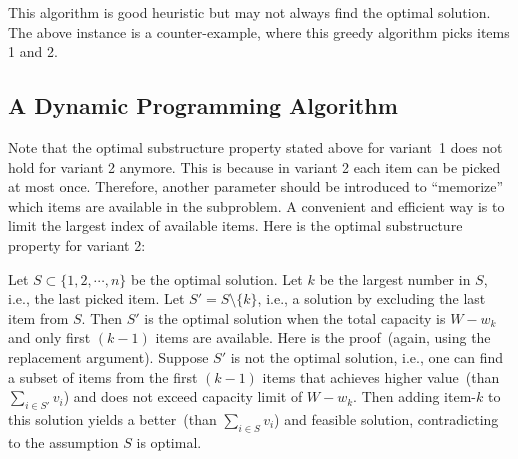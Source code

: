 \begin{algorithmblock}[0.8\textwidth]
	\xxx
	\xxx
	\xxx
	\xxx
	\xxx
	\xxx
	\xxx
	\xxx
	\xxx
\end{algorithmblock}


This algorithm is good heuristic but may not always find the optimal solution.
The above instance is a counter-example, where this greedy algorithm
picks items 1 and 2.


\subsection*{A Dynamic Programming Algorithm}


Note that the optimal substructure property stated above for variant~1 does not hold for variant 2 anymore.
This is because in variant 2 each item can be picked at most once. Therefore, another parameter should
be introduced to ``memorize'' which items are available in the subproblem. A convenient and efficient way is to
limit the largest index of available items. Here is the optimal substructure property for variant 2:

Let $S\subset\{1,2,\cdots, n\}$ be the optimal solution. %
Let $k$ be the largest number in $S$, i.e., the last picked item.
Let $S' = S\setminus \{k\}$, i.e., a solution by excluding the last item from $S$.
Then $S'$ is the optimal solution when the total capacity is $W - w_k$ and only first $(k-1)$ items are available.
Here is the proof~(again, using the replacement argument). 
Suppose $S'$ is not the optimal solution,
i.e., one can find a subset of items from the first $(k-1)$ items that achieves higher value~(than $\sum_{i\in S'} v_i$) 
and does not exceed capacity limit of $W - w_k$.
Then adding item-$k$ to this solution yields a better~(than $\sum_{i\in S} v_i$) 
and feasible solution, contradicting to the assumption $S$ is optimal.

